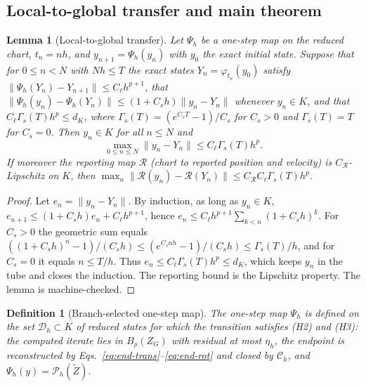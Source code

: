 \documentclass[preprint,12pt]{elsarticle}
\newtheorem{definition}{Definition}
\newtheorem{lemma}{Lemma}
\begin{document}
\subsection{Local-to-global transfer and main theorem}

\begin{lemma}[Local-to-global transfer]
\label{lem:local-global-transfer}
Let $\Psi_h$ be a one-step map on the reduced chart, $t_n=nh$, and $y_{n+1}=\Psi_h(y_n)$ with $y_0$
the exact initial state. Suppose that for $0\le n<N$ with $Nh\le T$ the exact states
$Y_n=\varphi_{t_n}(y_0)$ satisfy $\|\Psi_h(Y_n)-Y_{n+1}\|\le C_\ell h^{p+1}$, that
$\|\Psi_h(y_n)-\Psi_h(Y_n)\|\le(1+C_sh)\|y_n-Y_n\|$ whenever $y_n\in K$, and that
$C_\ell\Gamma_s(T)h^p\le d_K$, where $\Gamma_s(T)=(e^{C_sT}-1)/C_s$ for $C_s>0$ and
$\Gamma_s(T)=T$ for $C_s=0$. Then $y_n\in K$ for all $n\le N$ and
\begin{equation}
\label{eq:local-global-lemma-grid-bound}
  \max_{0\le n\le N}\|y_n-Y_n\|\le C_\ell\Gamma_s(T)h^p .
\end{equation}
If moreover the reporting map $\mathcal R$ (chart to reported position and velocity) is
$C_{\mathcal R}$-Lipschitz on $K$, then
$\max_n\|\mathcal R(y_n)-\mathcal R(Y_n)\|\le C_{\mathcal R}C_\ell\Gamma_s(T)h^p$.
\end{lemma}

\begin{proof}
Let $e_n=\|y_n-Y_n\|$. By induction, as long as $y_n\in K$,
$e_{n+1}\le(1+C_sh)e_n+C_\ell h^{p+1}$, hence $e_n\le C_\ell h^{p+1}\sum_{k<n}(1+C_sh)^k$. For
$C_s>0$ the geometric sum equals $((1+C_sh)^n-1)/(C_sh)\le(e^{C_snh}-1)/(C_sh)\le\Gamma_s(T)/h$,
and for $C_s=0$ it equals $n\le T/h$. Thus $e_n\le C_\ell\Gamma_s(T)h^p\le d_K$, which keeps $y_n$
in the tube and closes the induction. The reporting bound is the Lipschitz property. The lemma is
machine-checked.
\end{proof}

\begin{definition}[Branch-selected one-step map]
\label{def:accepted-branch-map}
The one-step map $\Psi_h$ is defined on the set $\mathcal D_h\subset K$ of reduced states for which
the transition satisfies (H2) and (H3): the computed iterate lies in $B_\rho(Z_G)$ with residual at
most $\eta_h$, the endpoint is reconstructed by Eqs.~\eqref{eq:end-trans}--\eqref{eq:end-rot} and
closed by $\mathcal C_h$, and $\Psi_h(y)=\mathcal P_h(\widetilde Z)$.
\end{definition}
\end{document}
